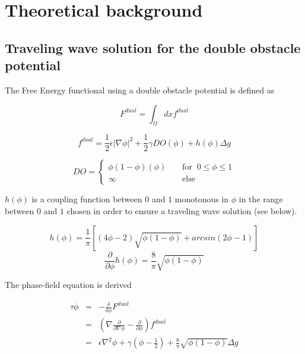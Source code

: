 \section{Theoretical background} \label{tb}
\subsection{Traveling wave solution for the double obstacle potential}

The Free Energy functional using a double obstacle potential is defined as

\begin{equation}
  \label{total_freeEnergy}
  F^{dual} =\int_\Omega dx f^{dual}
\end{equation}

\begin{equation}
  \label{freeEnergyDensity}
  f^{dual} = \frac 1 2 \epsilon |\nabla \phi |^2 + \frac 1 2 \gamma DO(\phi) + h(\phi) \Delta g
\end{equation}

\begin{equation}
  \label{doubleObstacle}
\nonumber  DO =\begin {cases} \phi(1-\phi) (\phi)\;\;\;\;& \mbox{for}\;\; 0\le \phi \le 1
 \\\infty &\mbox{else}\end{cases}
\end{equation}

$h(\phi)$ is a coupling function between $0$ and $1$ monotonous in $\phi$ in the range between $0$ and $1$ chosen in order to ensure a traveling wave solution (see below).

\begin{equation}
  \label{hVonPhi}
  h(\phi) = \frac1\pi[(4\phi-2)\sqrt{\phi(1-\phi)} + arcsin(2\phi-1)]
\end{equation}
\begin{equation}
  \label{hVonPhiStrich}
  \frac\partial  {\partial\phi} h(\phi) = \frac8\pi \sqrt{\phi(1-\phi)}
\end{equation}

The phase-field equation is derived

\begin{eqnarray}
  \label{relaxPhiDO}
 \nonumber \tau \dot{\phi} &=& - \frac\delta{\delta\phi} F^{dual} \\
 \nonumber &=& (\nabla \frac{\partial}{\partial \nabla \phi} - \frac\partial  {\partial\phi})f^{dual} \\
  &=& \epsilon \nabla^2 \phi + \gamma(\phi-\frac12) + \frac8\pi\sqrt{\phi(1-\phi)} \Delta g
\end{eqnarray}

